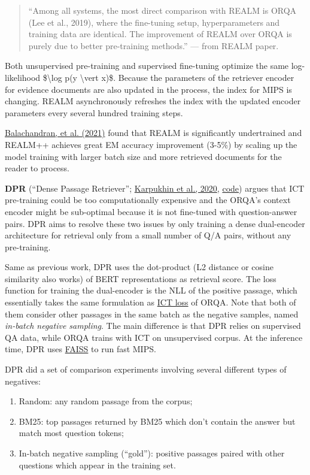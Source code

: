 \begin{quote}
``Among all systems, the most direct comparison with REALM is ORQA (Lee et al., 2019), where the fine-tuning setup, hyperparameters and training data are identical. The improvement of REALM over ORQA is purely due to better pre-training methods.'' --- from REALM paper.
\end{quote}

Both unsupervised pre-training and supervised fine-tuning optimize the same log-likelihood \$\textbackslash log p(y \textbackslash vert x)\$. Because the parameters of the retriever encoder for evidence documents are also updated in the process, the index for MIPS is changing. REALM asynchronously refreshes the index with the updated encoder parameters every several hundred training steps.

\href{https://arxiv.org/abs/2104.08710}{Balachandran, et al. (2021)} found that REALM is significantly undertrained and REALM++ achieves great EM accuracy improvement (3-5\%) by scaling up the model training with larger batch size and more retrieved documents for the reader to process.

\label{DPR}{}\textbf{DPR} (``Dense Passage Retriever''; \href{https://arxiv.org/abs/2004.04906}{Karpukhin et al., 2020}, \href{https://github.com/facebookresearch/DPR}{code}) argues that ICT pre-training could be too computationally expensive and the ORQA's context encoder might be sub-optimal because it is not fine-tuned with question-answer pairs. DPR aims to resolve these two issues by only training a dense dual-encoder architecture for retrieval only from a small number of Q/A pairs, without any pre-training.

Same as previous work, DPR uses the dot-product (L2 distance or cosine similarity also works) of BERT representations as retrieval score. The loss function for training the dual-encoder is the NLL of the positive passage, which essentially takes the same formulation as \hyperref[ICT-loss]{ICT loss} of ORQA. Note that both of them consider other passages in the same batch as the negative samples, named \emph{in-batch negative sampling}. The main difference is that DPR relies on supervised QA data, while ORQA trains with ICT on unsupervised corpus. At the inference time, DPR uses \href{https://github.com/facebookresearch/faiss}{FAISS} to run fast MIPS.

DPR did a set of comparison experiments involving several different types of negatives:

\begin{enumerate}
\tightlist
\item
  Random: any random passage from the corpus;
\item
  BM25: top passages returned by BM25 which don't contain the answer but match most question tokens;
\item
  In-batch negative sampling (``gold''): positive passages paired with other questions which appear in the training set.
\end{enumerate}

